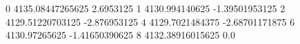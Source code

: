 0 4135.08447265625 2.6953125
1 4130.994140625 -1.39501953125
2 4129.51220703125 -2.876953125
4 4129.7021484375 -2.68701171875
6 4130.97265625 -1.41650390625
8 4132.38916015625 0.0
